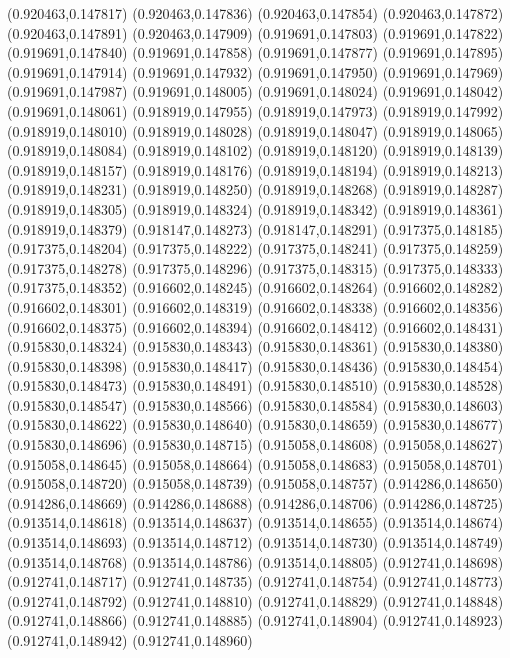 (0.920463,0.147817)
(0.920463,0.147836)
(0.920463,0.147854)
(0.920463,0.147872)
(0.920463,0.147891)
(0.920463,0.147909)
(0.919691,0.147803)
(0.919691,0.147822)
(0.919691,0.147840)
(0.919691,0.147858)
(0.919691,0.147877)
(0.919691,0.147895)
(0.919691,0.147914)
(0.919691,0.147932)
(0.919691,0.147950)
(0.919691,0.147969)
(0.919691,0.147987)
(0.919691,0.148005)
(0.919691,0.148024)
(0.919691,0.148042)
(0.919691,0.148061)
(0.918919,0.147955)
(0.918919,0.147973)
(0.918919,0.147992)
(0.918919,0.148010)
(0.918919,0.148028)
(0.918919,0.148047)
(0.918919,0.148065)
(0.918919,0.148084)
(0.918919,0.148102)
(0.918919,0.148120)
(0.918919,0.148139)
(0.918919,0.148157)
(0.918919,0.148176)
(0.918919,0.148194)
(0.918919,0.148213)
(0.918919,0.148231)
(0.918919,0.148250)
(0.918919,0.148268)
(0.918919,0.148287)
(0.918919,0.148305)
(0.918919,0.148324)
(0.918919,0.148342)
(0.918919,0.148361)
(0.918919,0.148379)
(0.918147,0.148273)
(0.918147,0.148291)
(0.917375,0.148185)
(0.917375,0.148204)
(0.917375,0.148222)
(0.917375,0.148241)
(0.917375,0.148259)
(0.917375,0.148278)
(0.917375,0.148296)
(0.917375,0.148315)
(0.917375,0.148333)
(0.917375,0.148352)
(0.916602,0.148245)
(0.916602,0.148264)
(0.916602,0.148282)
(0.916602,0.148301)
(0.916602,0.148319)
(0.916602,0.148338)
(0.916602,0.148356)
(0.916602,0.148375)
(0.916602,0.148394)
(0.916602,0.148412)
(0.916602,0.148431)
(0.915830,0.148324)
(0.915830,0.148343)
(0.915830,0.148361)
(0.915830,0.148380)
(0.915830,0.148398)
(0.915830,0.148417)
(0.915830,0.148436)
(0.915830,0.148454)
(0.915830,0.148473)
(0.915830,0.148491)
(0.915830,0.148510)
(0.915830,0.148528)
(0.915830,0.148547)
(0.915830,0.148566)
(0.915830,0.148584)
(0.915830,0.148603)
(0.915830,0.148622)
(0.915830,0.148640)
(0.915830,0.148659)
(0.915830,0.148677)
(0.915830,0.148696)
(0.915830,0.148715)
(0.915058,0.148608)
(0.915058,0.148627)
(0.915058,0.148645)
(0.915058,0.148664)
(0.915058,0.148683)
(0.915058,0.148701)
(0.915058,0.148720)
(0.915058,0.148739)
(0.915058,0.148757)
(0.914286,0.148650)
(0.914286,0.148669)
(0.914286,0.148688)
(0.914286,0.148706)
(0.914286,0.148725)
(0.913514,0.148618)
(0.913514,0.148637)
(0.913514,0.148655)
(0.913514,0.148674)
(0.913514,0.148693)
(0.913514,0.148712)
(0.913514,0.148730)
(0.913514,0.148749)
(0.913514,0.148768)
(0.913514,0.148786)
(0.913514,0.148805)
(0.912741,0.148698)
(0.912741,0.148717)
(0.912741,0.148735)
(0.912741,0.148754)
(0.912741,0.148773)
(0.912741,0.148792)
(0.912741,0.148810)
(0.912741,0.148829)
(0.912741,0.148848)
(0.912741,0.148866)
(0.912741,0.148885)
(0.912741,0.148904)
(0.912741,0.148923)
(0.912741,0.148942)
(0.912741,0.148960)
